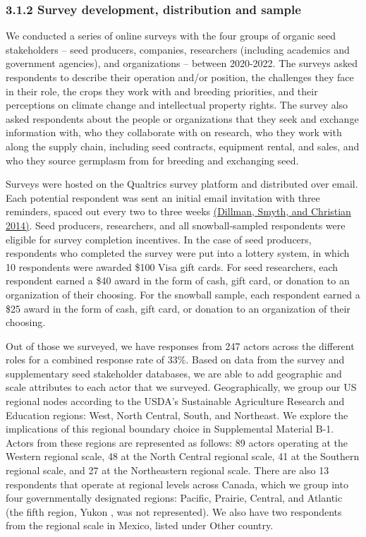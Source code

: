 \documentclass[twoside,12pt,final]{ucthesis-CA2012}
\begin{document}
\begin{ucmainmatter}
\hypertarget{survey-development-distribution-and-sample}{%
\subsubsection{3.1.2 Survey development, distribution and sample}\label{survey-development-distribution-and-sample}}

We conducted a series of online surveys with the four groups of organic
seed stakeholders -- seed producers, companies, researchers (including
academics and government agencies), and organizations -- between
2020-2022. The surveys asked respondents to describe their operation
and/or position, the challenges they face in their role, the crops they
work with and breeding priorities, and their perceptions on climate
change and intellectual property rights. The survey also asked
respondents about the people or organizations that they seek and
exchange information with, who they collaborate with on research, who
they work with along the supply chain, including seed contracts,
equipment rental, and sales, and who they source germplasm from for
breeding and exchanging seed.

Surveys were hosted on the Qualtrics survey platform and distributed
over email. Each potential respondent was sent an initial email
invitation with three reminders, spaced out every two to three weeks
\href{https://www.zotero.org/google-docs/?vs7ZWm}{(Dillman, Smyth, and Christian
2014)}. Seed producers,
researchers, and all snowball-sampled respondents were eligible for
survey completion incentives. In the case of seed producers, respondents
who completed the survey were put into a lottery system, in which 10
respondents were awarded \$100 Visa gift cards. For seed researchers,
each respondent earned a \$40 award in the form of cash, gift card, or
donation to an organization of their choosing. For the snowball sample,
each respondent earned a \$25 award in the form of cash, gift card, or
donation to an organization of their choosing.

Out of those we surveyed, we have responses from 247 actors across the
different roles for a combined response rate of 33\%. Based on data from
the survey and supplementary seed stakeholder databases, we are able to
add geographic and scale attributes to each actor that we surveyed.
Geographically, we group our US regional nodes according to the USDA's
Sustainable Agriculture Research and Education regions: West, North
Central, South, and Northeast. We explore the implications of this
regional boundary choice in Supplemental Material B-1. Actors from these
regions are represented as follows: 89 actors operating at the Western
regional scale, 48 at the North Central regional scale, 41 at the
Southern regional scale, and 27 at the Northeastern regional scale.
There are also 13 respondents that operate at regional levels across
Canada, which we group into four governmentally designated regions:
Pacific, Prairie, Central, and Atlantic (the fifth region, Yukon , was
not represented). We also have two respondents from the regional scale
in Mexico, listed under \textquotesingle Other country\textquotesingle.


\end{ucmainmatter}
\end{document}
